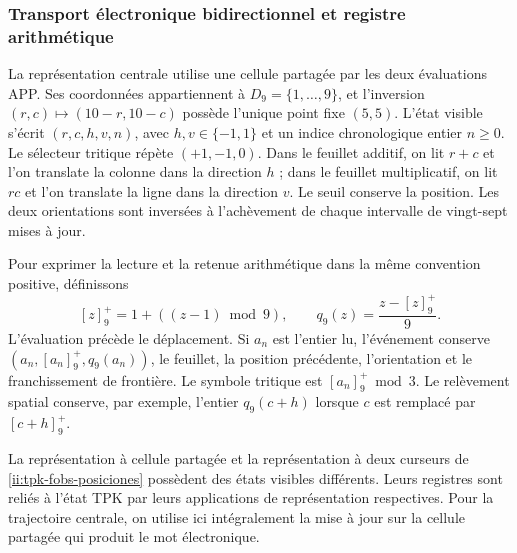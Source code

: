 \subsubsection{Transport électronique bidirectionnel et registre arithmétique}
\label{ii:transporte-electronico}

La représentation centrale utilise une cellule partagée par les deux
évaluations APP. Ses coordonnées appartiennent à \(D_9=\{1,\ldots,9\}\),
et l'inversion \((r,c)\mapsto(10-r,10-c)\) possède l'unique point fixe
\((5,5)\). L'état visible s'écrit \((r,c,h,v,n)\), avec
\(h,v\in\{-1,1\}\) et un indice chronologique entier \(n\geq0\).
Le sélecteur tritique répète \((+1,-1,0)\). Dans le feuillet additif, on lit
\(r+c\) et l'on translate la colonne dans la direction \(h\) ; dans le
feuillet multiplicatif, on lit \(rc\) et l'on translate la ligne dans la direction
\(v\). Le seuil conserve la position. Les deux orientations sont
inversées à l'achèvement de chaque intervalle de vingt-sept mises à jour.

Pour exprimer la lecture et la retenue arithmétique dans la même convention positive,
définissons
\[
 [z]^+_9=1+((z-1)\bmod9),\qquad
 q_9(z)=\frac{z-[z]^+_9}{9}.
\]
L'évaluation précède le déplacement. Si \(a_n\) est l'entier
lu, l'événement conserve \((a_n,[a_n]^+_9,q_9(a_n))\), le feuillet,
la position précédente, l'orientation et le franchissement de frontière. Le
symbole tritique est \([a_n]^+_9\bmod3\). Le relèvement spatial
conserve, par exemple, l'entier
\(q_9(c+h)\) lorsque \(c\) est remplacé par \([c+h]^+_9\).

La représentation à cellule partagée et la représentation à deux
curseurs de \eqref{ii:tpk-fobs-posiciones} possèdent des états visibles
différents. Leurs registres sont reliés à l'état TPK par
leurs applications de représentation respectives. Pour la trajectoire centrale,
on utilise ici intégralement la mise à jour sur la cellule
partagée qui produit le mot électronique.

